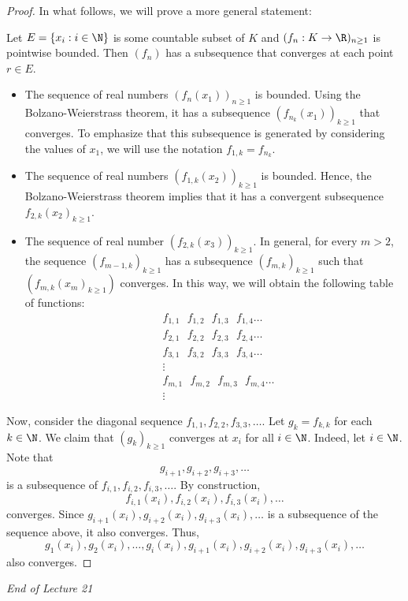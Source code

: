 \begin{proof}
In what follows, we will prove a more general statement:
\begin{center}
    Let \( E = \{ {x}_{i} : i \in \N  \}  \) is some countable subset of \( K  \) and \( ({f}_{n} : K \to \R )_{n \geq 1} \) is pointwise bounded. Then \( ({f}_{n}) \) has a subsequence that converges at each point \( r \in E  \). 
\end{center}
\begin{itemize}
    \item The sequence of real numbers \( ({f}_{n}({x}_{1}))_{n \geq 1} \) is bounded. Using the Bolzano-Weierstrass theorem, it has a subsequence \( ({f}_{{n}_{k }}({x}_{1}))_{k \geq 1} \) that converges. To emphasize that this subsequence is generated by considering the values of \( {x}_{1} \), we will use the notation \( {f}_{1,k} = {f}_{{n}_{k }} \). 
    \item The sequence of real numbers \( ({f}_{1,k}({x}_{2}))_{k \geq 1} \) is bounded. Hence, the Bolzano-Weierstrass theorem implies that it has a convergent subsequence \( {f}_{2,k}({x}_{2})_{k \geq 1} \). 
    \item The sequence of real number \( ({f}_{2,k}({x}_{3}))_{k \geq 1} \). In general, for every \( m > 2  \), the sequence \( ({f}_{m-1,k})_{k \geq 1} \) has a subsequence \( ({f}_{m,k })_{k \geq 1} \) such that \( ({f}_{m,k}({x}_{m})_{k \geq 1}) \) converges. In this way, we will obtain the following table of functions:
    \begin{align*}
        &{f}_{1,1}  \ \ \  {f}_{1,2} \ \ \   {f}_{1,3} \ \ \   {f}_{1,4} \dots  \\
        &{f}_{2,1} \  \ \   {f}_{2,2} \ \ \   {f}_{2,3} \ \ \  {f}_{2,4} \dots  \\
        &{f}_{3,1} \  \ \  {f}_{3,2} \ \ \   {f}_{3,3} \ \ \   {f}_{3,4} \dots  \\
        &\vdots \\
        &{f}_{m,1} \ \ \   {f}_{m,2} \ \ \   {f}_{m,3} \ \ \   {f}_{m,4} \dots  \\
        &\vdots
    \end{align*}
\end{itemize}
Now, consider the diagonal sequence \( {f}_{1,1} , {f}_{2,2}, {f}_{3,3}, \dots \). Let \( {g}_{k } = {f}_{k,k} \) for each \( k \in \N  \). We claim that \( ({g}_{k })_{k \geq 1} \) converges at \( {x}_{i} \) for all \( i \in \N  \). Indeed, let \( i \in \N  \). Note that 
\[  {g}_{i+1}, {g}_{i+2}, {g}_{i+3}, \dots  \]
is a subsequence of \( {f}_{i,1}, {f}_{i,2}, {f}_{i,3}, \dots \). By construction,  
\[  {f}_{i,1}({x}_{i}), {f}_{i,2}({x}_{i}), {f}_{i,3}({x}_{i}), \dots \]
converges. Since \( {g}_{i+1}({x}_{i}), {g}_{i+2}({x}_{i}), {g}_{i+3}({x}_{i}), \dots  \) is a subsequence of the sequence above, it also converges. Thus,   
\[  {g}_{1}({x}_{i}), {g}_{2}({x}_{i}), \dots, {g}_{i}({x}_{i}) , {g}_{i+1}({x}_{i}) , {g}_{i+2}({x}_{i}), {g}_{i+3}({x}_{i}) , \dots  \]
also converges.
\end{proof}


\begin{center}
    \textit{End of Lecture 21} 
\end{center}
